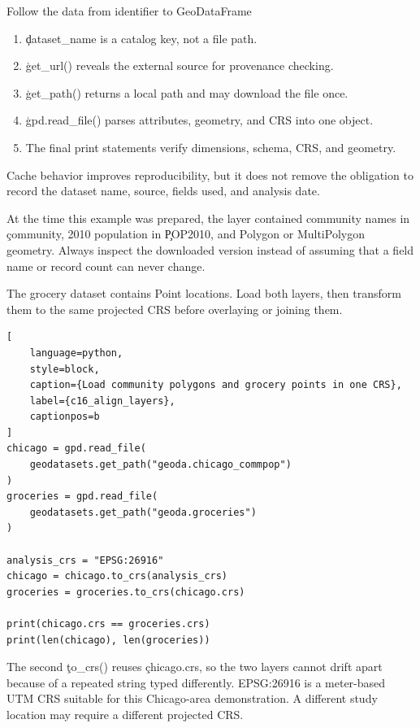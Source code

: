 \begin{SyntaxBox}{Follow the data from identifier to GeoDataFrame}
\begin{enumerate}
    \item \c{dataset_name} is a catalog key, not a file path.
    \item \c{get_url()} reveals the external source for provenance checking.
    \item \c{get_path()} returns a local path and may download the file once.
    \item \c{gpd.read_file()} parses attributes, geometry, and CRS into one object.
    \item The final print statements verify dimensions, schema, CRS, and geometry.
\end{enumerate}
Cache behavior improves reproducibility, but it does not remove the obligation
to record the dataset name, source, fields used, and analysis date.
\end{SyntaxBox}

At the time this example was prepared, the layer contained community names in
\c{community}, 2010 population in \c{POP2010}, and Polygon or MultiPolygon
geometry. Always inspect the downloaded version instead of assuming that a
field name or record count can never change.


The grocery dataset contains Point locations. Load both layers, then transform
them to the same projected CRS before overlaying or joining them.

\begin{lstlisting}[
    language=python,
    style=block,
    caption={Load community polygons and grocery points in one CRS},
    label={c16_align_layers},
    captionpos=b
]
chicago = gpd.read_file(
    geodatasets.get_path("geoda.chicago_commpop")
)
groceries = gpd.read_file(
    geodatasets.get_path("geoda.groceries")
)

analysis_crs = "EPSG:26916"
chicago = chicago.to_crs(analysis_crs)
groceries = groceries.to_crs(chicago.crs)

print(chicago.crs == groceries.crs)
print(len(chicago), len(groceries))
\end{lstlisting}

The second \c{to_crs()} reuses \c{chicago.crs}, so the two layers cannot drift
apart because of a repeated string typed differently. EPSG:26916 is a
meter-based UTM CRS suitable for this Chicago-area demonstration. A different
study location may require a different projected CRS.

